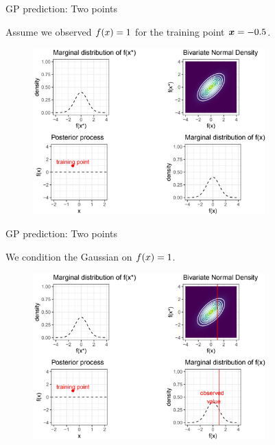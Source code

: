\begin{frame}{GP prediction: Two points}

\begin{footnotesize}
  Assume we observed $f(x) = 1$ for the training point $\bm{x} = -0.5$.  
\end{footnotesize}\vspace*{0.2cm}

\begin{figure}
  \includegraphics[width=0.8\textwidth]{figure_man/GP02.png}
\end{figure}

\end{frame}
\begin{frame}{GP prediction: Two points}

\begin{footnotesize}
  We condition the Gaussian on $f(x) = 1$.
\end{footnotesize}\vspace*{0.2cm}

\begin{figure}
  \includegraphics[width=0.8\textwidth]{figure_man/GP03.png}
\end{figure}

\end{frame}


